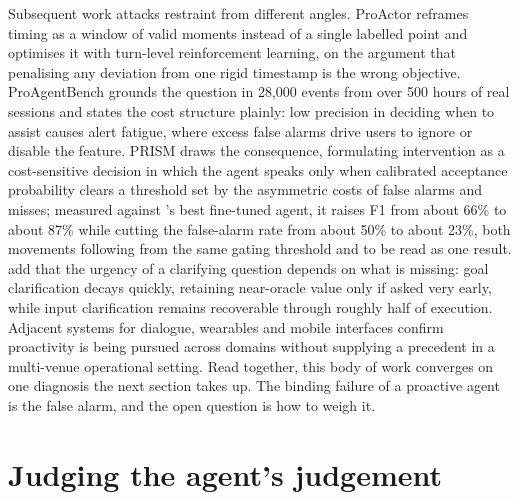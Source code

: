 Subsequent work attacks restraint from different angles. ProActor
\citep{ding_proactor_2026} reframes timing as a window of valid moments instead
of a single labelled point and optimises it with turn-level reinforcement
learning, on the argument that penalising any deviation from one rigid timestamp
is the wrong objective. ProAgentBench
\citep[a 2026 preprint]{tang_proagentbench_2026} grounds the question in 28,000
events from over 500 hours of real sessions and states the cost structure
plainly: low precision in deciding when to assist causes alert fatigue, where
excess false alarms drive users to ignore or disable the feature. PRISM
\citep[a 2026 preprint]{fu_prism_2026} draws the consequence, formulating
intervention as a cost-sensitive decision in which the agent speaks only when
calibrated acceptance probability clears a threshold set by the asymmetric costs
of false alarms and misses; measured against \citeauthor{lu_proactive_2024}'s
best fine-tuned agent, it raises F1 from about 66\% to about 87\% while cutting
the false-alarm rate from about 50\% to about 23\%, both movements following from
the same gating threshold and to be read as one result.
\citet[a 2026 preprint]{gulati_ask_2026} add that the urgency of a clarifying
question depends on what is missing: goal clarification decays quickly, retaining
near-oracle value only if asked very early, while input clarification remains
recoverable through roughly half of execution. Adjacent systems for dialogue,
wearables and mobile interfaces
\citep{liu_proactiveeval_2025,yang_contextagent_2025,yang_fingertip_2025} confirm
proactivity is being pursued across domains without supplying a precedent in a
multi-venue operational setting. Read together, this body of work converges on
one diagnosis the next section takes up. The binding failure of a proactive agent
is the false alarm, and the open question is how to weigh it.

\section{Judging the agent's judgement}
\label{sec:rw-evaluation}

